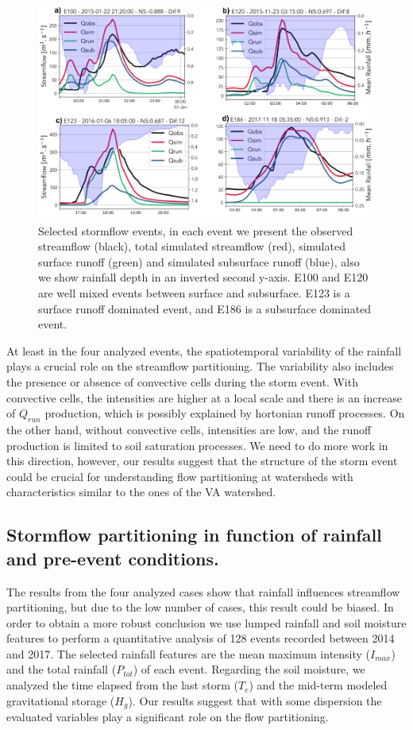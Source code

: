 \documentclass[preprint,12pt]{elsarticle}
\begin{document}
\begin{figure}[t]
    \centering
    \includegraphics[width=14cm]{Figuras/Cuatro_eventos.png}
    \caption{Selected stormflow events, in each event we present the observed streamflow (black), total simulated streamflow (red), simulated surface runoff (green) and simulated subsurface runoff (blue), also we show rainfall depth in an inverted second y-axis. E100 and E120 are well mixed events between surface and subsurface. E123 is a surface runoff dominated event, and E186 is a subsurface dominated event.}
    \label{fig:four_events}
\end{figure}
At least in the four analyzed events, the spatiotemporal variability of the rainfall  plays a crucial role on the streamflow partitioning. The variability also includes the presence or absence of convective cells during the storm event.  With convective cells, the intensities are higher at a local scale and there is an increase of  $Q_{run}$ production, which is possibly explained by hortonian runoff processes.  On the other hand, without convective cells, intensities are low, and the runoff production is limited to soil saturation processes.  We need to do more work in this direction, however, our results suggest that the structure of the storm event could be crucial for understanding flow partitioning at watersheds with characteristics similar to the ones of the VA watershed. 

\subsection{Stormflow partitioning in function of rainfall and pre-event conditions.}

The results from the four analyzed cases show that rainfall influences streamflow partitioning, but due to the low number of cases, this result could be biased.   In order to obtain a more robust conclusion we use lumped rainfall and soil moisture features to perform a quantitative analysis of 128 events recorded between 2014 and 2017. The selected rainfall features are the mean maximum intensity ($I_{max}$) and the total rainfall ($P_{tot}$) of each event.  Regarding the soil moisture, we analyzed the time elapsed from the last storm ($T_e$) and the mid-term modeled gravitational storage ($H_g$).  Our results suggest that with some dispersion the evaluated variables play a significant role on the flow partitioning.\\   
\end{document}
